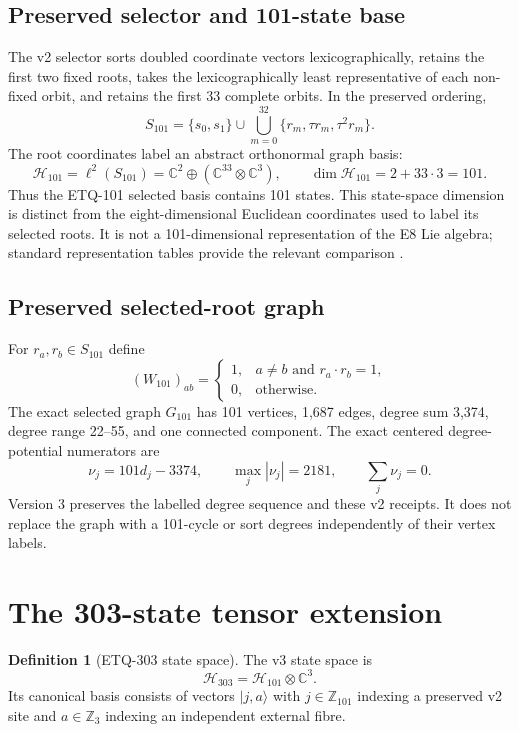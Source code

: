 \documentclass[11pt,a4paper]{article}
\theoremstyle{definition}
\newtheorem{definition}[theorem]{Definition}
\newcommand{\Hone}{\mathcal H_{101}}
\newcommand{\Hthree}{\mathcal H_{303}}
\newcommand{\Gone}{G_{101}}
\newcommand{\Zthree}{\mathbb Z_{3}}
\newcommand{\Zone}{\mathbb Z_{101}}
\begin{document}
\subsection{Preserved selector and 101-state base}
The v2 selector sorts doubled coordinate vectors lexicographically, retains the first two fixed roots, takes the lexicographically least representative of each non-fixed orbit, and retains the first 33 complete orbits. In the preserved ordering,
\begin{equation}
S_{101}=\{s_0,s_1\}\cup\bigcup_{m=0}^{32}\{r_m,\tau r_m,\tau^2r_m\}.
\end{equation}
The root coordinates label an abstract orthonormal graph basis:
\begin{equation}
\Hone=\ell^2(S_{101})
=\mathbb C^2\oplus(\mathbb C^{33}\otimes\mathbb C^3),
\qquad
\dim\Hone=2+33\cdot3=101.
\end{equation}
Thus the ETQ-101 selected basis contains 101 states. This state-space dimension is distinct from the eight-dimensional Euclidean coordinates used to label its selected roots. It is not a 101-dimensional representation of the E8 Lie algebra; standard representation tables provide the relevant comparison \cite{feger2015lieart}.

\subsection{Preserved selected-root graph}
For $r_a,r_b\in S_{101}$ define
\begin{equation}
(W_{101})_{ab}=\begin{cases}
1,&a\ne b\text{ and }r_a\cdot r_b=1,\\
0,&\text{otherwise.}
\end{cases}
\end{equation}
The exact selected graph $\Gone$ has 101 vertices, 1,687 edges, degree sum 3,374, degree range 22--55, and one connected component. The exact centered degree-potential numerators are
\begin{equation}
\nu_j=101d_j-3374,
\qquad
\max_j|\nu_j|=2181,
\qquad
\sum_j\nu_j=0.
\end{equation}
Version 3 preserves the labelled degree sequence and these v2 receipts. It does not replace the graph with a 101-cycle or sort degrees independently of their vertex labels.

\section{The 303-state tensor extension}
\begin{definition}[ETQ-303 state space]
The v3 state space is
\begin{equation}
\boxed{\Hthree=\Hone\otimes\mathbb C^3.}
\end{equation}
Its canonical basis consists of vectors $|j,a\rangle$ with $j\in\Zone$ indexing a preserved v2 site and $a\in\Zthree$ indexing an independent external fibre.
\end{definition}
\end{document}
